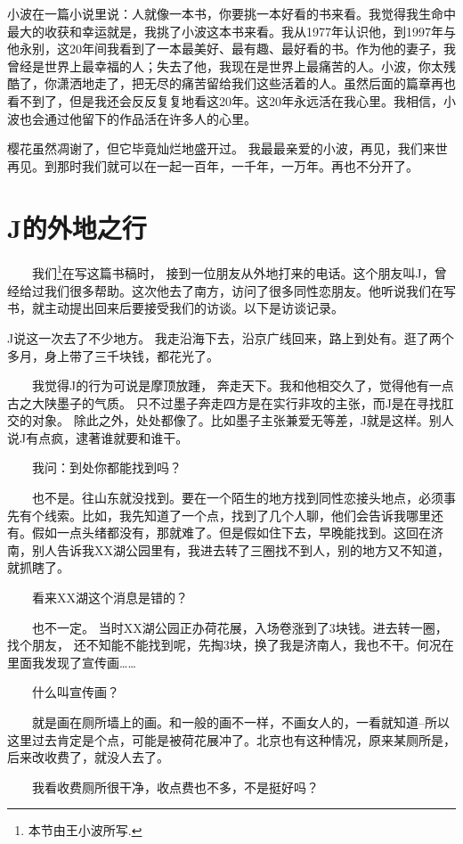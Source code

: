 小波在一篇小说里说：人就像一本书，你要挑一本好看的书来看。我觉得我生命中最大的收获和幸运就是，我挑了小波这本书来看。我从1977年认识他，到1997年与他永别，这20年间我看到了一本最美好、最有趣、最好看的书。作为他的妻子，我曾经是世界上最幸福的人；失去了他，我现在是世界上最痛苦的人。小波，你太残酷了，你潇洒地走了，把无尽的痛苦留给我们这些活着的人。虽然后面的篇章再也看不到了，但是我还会反反复复地看这20年。这20年永远活在我心里。我相信，小波也会通过他留下的作品活在许多人的心里。 

樱花虽然凋谢了，但它毕竟灿烂地盛开过。 我最最亲爱的小波，再见，我们来世再见。到那时我们就可以在一起一百年，一千年，一万年。再也不分开了。

\chapter{J的外地之行}


　　我们\footnote{本节由王小波所写.}在写这篇书稿时， 接到一位朋友从外地打来的电话。这个朋友叫J，曾经给过我们很多帮助。这次他去了南方，访问了很多同性恋朋友。他听说我们在写书，就主动提出回来后要接受我们的访谈。以下是访谈记录。

J说这一次去了不少地方。 我走沿海下去，沿京广线回来，路上到处有。逛了两个多月，身上带了三千块钱，都花光了。 
 
 　　我觉得J的行为可说是摩顶放踵， 奔走天下。我和他相交久了，觉得他有一点古之大陕墨子的气质。 只不过墨子奔走四方是在实行非攻的主张，而J是在寻找肛交的对象。 除此之外，处处都像了。比如墨子主张兼爱无等差，J就是这样。别人说J有点疯，逮著谁就要和谁干。 
 
 　　我问：到处你都能找到吗？ 
 
 　　也不是。往山东就没找到。要在一个陌生的地方找到同性恋接头地点，必须事先有个线索。比如，我先知道了一个点，找到了几个人聊，他们会告诉我哪里还有。假如一点头绪都没有，那就难了。但是假如住下去，早晚能找到。这回在济南，别人告诉我XX湖公园里有，我进去转了三圈找不到人，别的地方又不知道，就抓瞎了。 
 
 　　看来XX湖这个消息是错的？ 
 
 　　也不一定。 当时XX湖公园正办荷花展，入场卷涨到了3块钱。进去转一圈，找个朋友， 还不知能不能找到呢，先掏3块，换了我是济南人，我也不干。何况在里面我发现了宣传画…… 
 
 　　什么叫宣传画？ 
 
 　　就是画在厕所墙上的画。和一般的画不一样，不画女人的，一看就知道--所以这里过去肯定是个点，可能是被荷花展冲了。北京也有这种情况，原来某厕所是，后来改收费了，就没人去了。 
 
 　　我看收费厕所很干净，收点费也不多，不是挺好吗？ 
 
